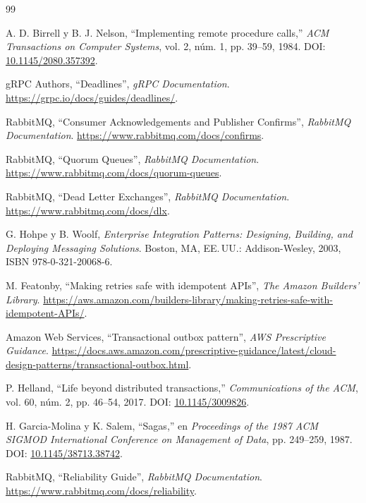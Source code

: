 \documentclass[12pt,a4paper]{article}
\begin{document}
\begin{thebibliography}{99}

A. D. Birrell y B. J. Nelson,
``Implementing remote procedure calls,''
\textit{ACM Transactions on Computer Systems},
vol. 2, núm. 1, pp. 39--59, 1984.
DOI:
\href{https://doi.org/10.1145/2080.357392}
{10.1145/2080.357392}.

gRPC Authors,
``Deadlines'',
\textit{gRPC Documentation}.
\url{https://grpc.io/docs/guides/deadlines/}.

RabbitMQ,
``Consumer Acknowledgements and Publisher Confirms'',
\textit{RabbitMQ Documentation}.
\url{https://www.rabbitmq.com/docs/confirms}.

RabbitMQ,
``Quorum Queues'',
\textit{RabbitMQ Documentation}.
\url{https://www.rabbitmq.com/docs/quorum-queues}.

RabbitMQ,
``Dead Letter Exchanges'',
\textit{RabbitMQ Documentation}.
\url{https://www.rabbitmq.com/docs/dlx}.

G. Hohpe y B. Woolf,
\textit{Enterprise Integration Patterns: Designing, Building, and Deploying Messaging Solutions}.
Boston, MA, EE.\,UU.: Addison-Wesley, 2003, ISBN 978-0-321-20068-6.

M. Featonby,
``Making retries safe with idempotent APIs'',
\textit{The Amazon Builders' Library}.
\url{https://aws.amazon.com/builders-library/making-retries-safe-with-idempotent-APIs/}.

Amazon Web Services,
``Transactional outbox pattern'',
\textit{AWS Prescriptive Guidance}.
\url{https://docs.aws.amazon.com/prescriptive-guidance/latest/cloud-design-patterns/transactional-outbox.html}.

P. Helland,
``Life beyond distributed transactions,''
\textit{Communications of the ACM},
vol. 60, núm. 2, pp. 46--54, 2017.
DOI:
\href{https://doi.org/10.1145/3009826}
{10.1145/3009826}.

H. Garcia-Molina y K. Salem,
``Sagas,''
en \textit{Proceedings of the 1987 ACM SIGMOD
International Conference on Management of Data},
pp. 249--259, 1987.
DOI:
\href{https://doi.org/10.1145/38713.38742}
{10.1145/38713.38742}.

RabbitMQ,
``Reliability Guide'',
\textit{RabbitMQ Documentation}.
\url{https://www.rabbitmq.com/docs/reliability}.

\end{thebibliography}
\end{document}
